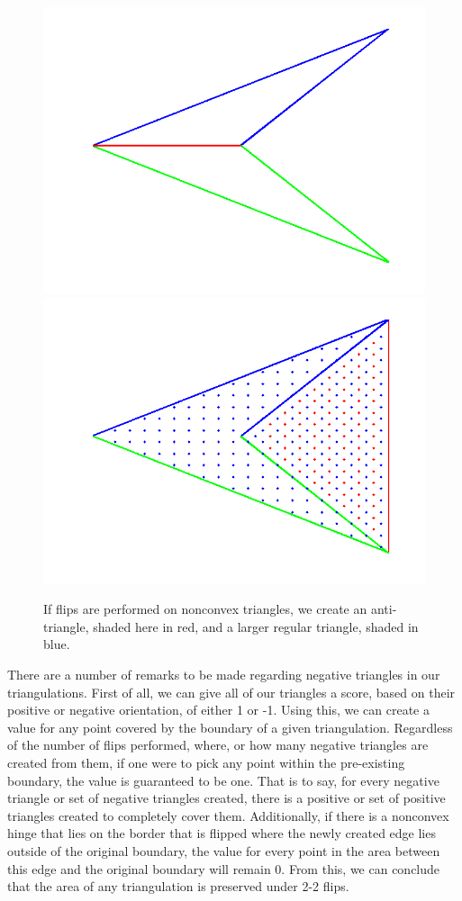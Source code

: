 \documentclass[12pt]{article}
\begin{document}
\begin{figure}
\label{antitri}
\centering
\includegraphics[scale = 0.4]{Pictures/antitri1.png}
\includegraphics[scale = 0.4]{Pictures/antitri2.png}
\caption{If flips are performed on nonconvex triangles, we create an anti-triangle, shaded here in red, and a larger regular triangle, shaded in blue.}
\label{AntiTri}
\end{figure}

 There are a number of remarks to be made regarding negative triangles in our triangulations. First of all, we can give all of our triangles a score, based on their positive or negative orientation, of either 1 or -1. Using this, we can create a value for any point covered by the boundary of a given triangulation. Regardless of the number of flips performed, where, or how many negative triangles are created from them, if one were to pick any point within the pre-existing boundary, the value is guaranteed to be one. That is to say, for every negative triangle or set of negative triangles created, there is a positive or set of positive triangles created to completely cover them. Additionally, if there is a nonconvex hinge that lies on the border that is flipped where the newly created edge lies outside of the original boundary, the value for every point in the area between this edge and the original boundary will remain 0. From this, we can conclude that the area of any triangulation is preserved under 2-2 flips.
\end{document}
